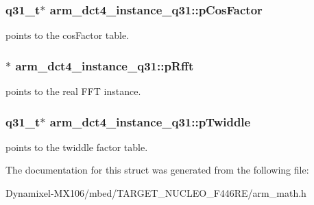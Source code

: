 \subsubsection[{\texorpdfstring{p\+Cos\+Factor}{pCosFactor}}]{\setlength{\rightskip}{0pt plus 5cm}q31\+\_\+t$\ast$ arm\+\_\+dct4\+\_\+instance\+\_\+q31\+::p\+Cos\+Factor}\hypertarget{structarm__dct4__instance__q31_af97204d1838925621fc82021a0c2d6c1}{}\label{structarm__dct4__instance__q31_af97204d1838925621fc82021a0c2d6c1}
points to the cos\+Factor table. 
\subsubsection[{\texorpdfstring{p\+Rfft}{pRfft}}]{$\ast$ arm\+\_\+dct4\+\_\+instance\+\_\+q31\+::p\+Rfft}\hypertarget{structarm__dct4__instance__q31_af1487dab5e7963b85dc0fdc6bf492542}{}\label{structarm__dct4__instance__q31_af1487dab5e7963b85dc0fdc6bf492542}
points to the real F\+FT instance. 
\subsubsection[{\texorpdfstring{p\+Twiddle}{pTwiddle}}]{\setlength{\rightskip}{0pt plus 5cm}q31\+\_\+t$\ast$ arm\+\_\+dct4\+\_\+instance\+\_\+q31\+::p\+Twiddle}\hypertarget{structarm__dct4__instance__q31_a7db236e22673146bb1d2c962f0713f08}{}\label{structarm__dct4__instance__q31_a7db236e22673146bb1d2c962f0713f08}
points to the twiddle factor table. 

The documentation for this struct was generated from the following file\+:\begin{DoxyCompactItemize}
\item 
Dynamixel-\/\+M\+X106/mbed/\+T\+A\+R\+G\+E\+T\+\_\+\+N\+U\+C\+L\+E\+O\+\_\+\+F446\+R\+E/arm\+\_\+math.\+h\end{DoxyCompactItemize}

